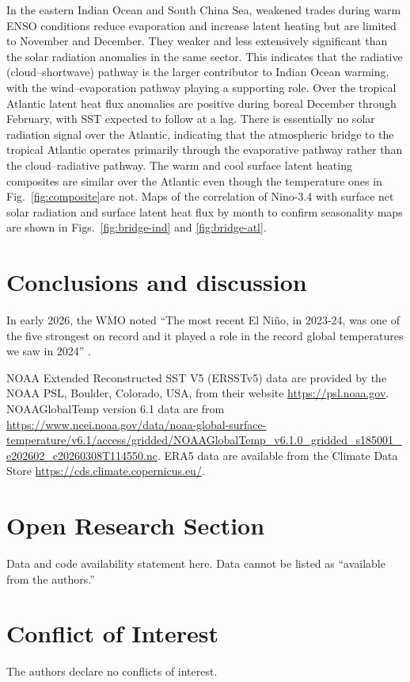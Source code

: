 \documentclass[draft]{agujournal2019}
\begin{document}
In the eastern Indian Ocean and South China Sea, weakened trades during warm ENSO conditions reduce evaporation and increase latent heating but are limited to November and December. They weaker and less extensively significant than the solar radiation anomalies in the same sector. This indicates that the radiative (cloud--shortwave) pathway is the larger contributor to Indian Ocean warming, with the wind--evaporation pathway playing a supporting role. Over the tropical Atlantic latent heat flux anomalies are positive during boreal December through February, with SST expected to follow at a lag. There is essentially no solar radiation signal over the Atlantic, indicating that the atmospheric bridge to the tropical Atlantic operates primarily through the evaporative pathway rather than the cloud--radiative pathway. The warm and cool surface latent heating composites are similar over the Atlantic even though the temperature ones in Fig.\ \ref{fig:composite}are not. Maps of the correlation of Nino-3.4 with surface net solar radiation and surface latent heat flux by month to confirm seasonality maps are shown in Figs.\ \ref{fig:bridge-ind} and \ref{fig:bridge-atl}.

\section{Conclusions and discussion}

In early 2026, the WMO noted ``The most recent El Ni\~no, in 2023-24, was one of the five strongest on record and it played a role in the record global temperatures we saw in 2024'' \cite{WMO2026enso}.

NOAA Extended Reconstructed SST V5 (ERSSTv5) data are provided by the NOAA PSL, Boulder, Colorado, USA, from their website \url{https://psl.noaa.gov}. NOAAGlobalTemp version 6.1 data are from \url{https://www.ncei.noaa.gov/data/noaa-global-surface-temperature/v6.1/access/gridded/NOAAGlobalTemp_v6.1.0_gridded_s185001_e202602_c20260308T114550.nc}. ERA5 data are available from the Climate Data Store \url{https://cds.climate.copernicus.eu/}.


\section*{Open Research Section}
Data and code availability statement here. Data cannot be listed as
``available from the authors.''

\section*{Conflict of Interest}
The authors declare no conflicts of interest.
\end{document}
